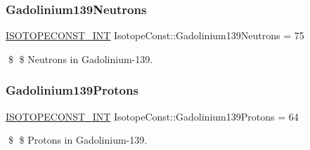 \subsubsection{\texorpdfstring{Gadolinium139\+Neutrons}{Gadolinium139Neutrons}}
{\footnotesize\ttfamily \mbox{\hyperlink{group___isotope_const-_macros_ga5f18360b3e99483a35c32d789e62621c}{I\+S\+O\+T\+O\+P\+E\+C\+O\+N\+S\+T\+\_\+\+I\+NT}} Isotope\+Const\+::\+Gadolinium139\+Neutrons = 75}

\$ \$ Neutrons in Gadolinium-\/139. \mbox{\label{group___isotope_const-_gadolinium-_gd139_gac19b1cc775eabe3d7a6cb94c4c9da8cb}} 
\subsubsection{\texorpdfstring{Gadolinium139\+Protons}{Gadolinium139Protons}}
{\footnotesize\ttfamily \mbox{\hyperlink{group___isotope_const-_macros_ga5f18360b3e99483a35c32d789e62621c}{I\+S\+O\+T\+O\+P\+E\+C\+O\+N\+S\+T\+\_\+\+I\+NT}} Isotope\+Const\+::\+Gadolinium139\+Protons = 64}

\$ \$ Protons in Gadolinium-\/139. 